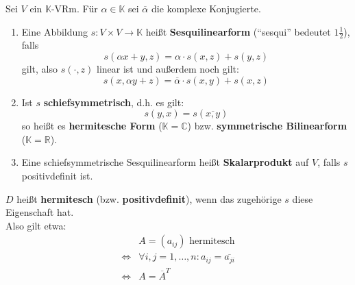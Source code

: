 \documentclass[parskip,a4paper,twoside,DIV15,BCOR12mm]{scrbook}
\begin{document}
\begin{comment}
\begin{enumerate}
\item Jeder normierte Raum $(V,\|\cdot\|)$ besitzt die Metrik:
\[d(x,y):=\|x-y\|\]
\item In der Linearen Algebra tauchen hauptsächlich Normen auf, die mit
\textbf{Skalarprodukten} definiert werden.
\end{enumerate}
\end{comment}

\begin{definition}
\renewcommand{\labelenumi}{(\alph{enumi})}
Sei $V$ ein $\mathbb{K}$-VRm. Für $\alpha\in\mathbb{K}$ sei $\overline\alpha$
die komplexe Konjugierte.
\begin{enumerate}
\item Eine Abbildung $s:V\times V\to\mathbb{K}$ heißt \textbf{Sesquilinearform}
("`sesqui"' bedeutet $1\frac12$), falls
\[s(\alpha x+y,z)=\alpha \cdot s(x,z)+s(y,z)\]
gilt, also $s(\cdot,z)$ linear ist und außerdem noch gilt:
\[s(x,\alpha y+z)=\overline\alpha \cdot s(x,y)+s(x,z)\]
\item Ist $s$ \textbf{schiefsymmetrisch}, d.h. es gilt:
\[s(y,x)=s(\overline{x,y})\]
so heißt es \textbf{hermitesche Form} ($\mathbb{K}=\mathbb{C}$) bzw.
\textbf{symmetrische Bilinearform} ($\mathbb{K}=\mathbb{R}$).
\item Eine schiefsymmetrische Sesquilinearform heißt \textbf{Skalarprodukt} auf $V$,
falls $s$ positivdefinit ist.
\end{enumerate}
\renewcommand{\labelenumi}{(\arabic{enumi})}
\end{definition}

\begin{comment}
\index{Darstellungsmatrix}
Ist $\dim V=n<\infty$ mit einer Basis $B=\{b_1,\ldots,b_n\}$, so ist eine
Sesquilinearform $s$ bestimmt durch die Werte $s(b_i,b_j)\in\mathbb{K}$, also
durch die \textbf{Darstellungsmatrix}
\[D_{BB}(s):=(s(b_i,bj))\in\mathbb{K}^{n\times n}\]
Jede beliebige Matrix $D=(d_{ij})\in\mathbb{K}^{n\times n}$ definiert ein
$s:=s_B^D$ mit:
\[s(\sum_{i=1}^n \alpha_i b_i,\sum_{j=1}^n \beta_j b_j)=\sum_{i=1}^n\sum_{j=1}^n \alpha_i\overline{\beta_j}\cdot d_{ij}\]
\end{comment}

\begin{definition}
$D$ heißt \textbf{hermitesch} (bzw. \textbf{positivdefinit}), wenn das zugehörige $s$
diese Eigenschaft hat.\\
Also gilt etwa:
\begin{align*}
&A=(a_{ij}) \text{ hermitesch}\\
\iff &\forall i,j=1,\ldots,n:a_{ij}=\overline{a_{ji}}\\
\iff &A=\overline{A}^T
\end{align*}
\end{definition}
\end{document}
